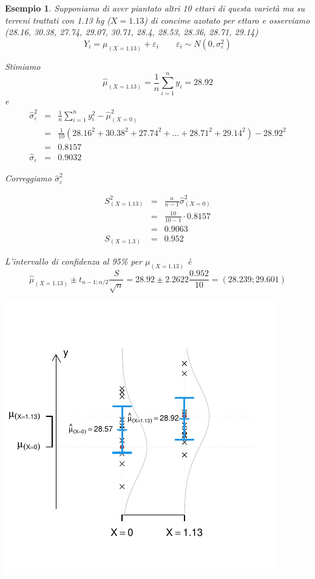 \documentclass[
  11pt,
]{book}
\theoremstyle{mytheoremstyle}
\theoremstyle{mydefstyle}
\newtheorem{example}{{Esempio}}[section]
\begin{document}
\begin{example}
Supponiamo di aver piantato altri 10 ettari di questa varietà ma su terreni trattati con 1.13 hg (\(X=1.13\))
di concime azotato per ettaro e osserviamo (28.16, 30.38, 27.74, 29.07, 30.71, 28.4, 28.53, 28.36, 28.71, 29.14)
\[Y_i=\mu_{(X=1.13)}+\varepsilon_i\qquad\varepsilon_i\sim N(0,\sigma_\varepsilon^2)\]

Stimiamo
\[\hat\mu_{(X=1.13)}=\frac 1 n\sum_{i=1}^n y_i=28.92\]
e
\begin{eqnarray*}
\hat\sigma_\varepsilon^2&=&\frac 1 n\sum_{i=1}^n y_i^2-\hat\mu_{(X=0)}^2\\
&=&\frac 1 {10}(28.16^2+30.38^2+27.74^2 +...+ 28.71^2+29.14^2)-28.92^2\\
&=&0.8157\\
\hat\sigma_\varepsilon &=& 0.9032
\end{eqnarray*}

Correggiamo \(\hat\sigma_\varepsilon^2\)

\begin{eqnarray*}
S_{(X=1.13)}^2&=&\frac{n}{n-1}\hat\sigma_{(X=0)}^2\\
&=&\frac{10}{10-1}\cdot0.8157\\
&=&0.9063\\
S_{(X=1.3)}&=&0.952
\end{eqnarray*}

L'intervallo di confidenza al 95\% per \(\mu_{(X=1.13)}\) è
\[\hat\mu_{(X=1.13)}\pm t_{n-1;\alpha/2}\frac S{\sqrt n}=28.92\pm 2.2622\frac{0.952}{10}=
(28.239;29.601)\]

\begin{center}\includegraphics{Appunti_di_Statistica_2025_files/figure-latex/17-regressione-I-10-1} \end{center}


\end{example}
\end{document}
